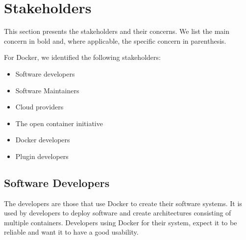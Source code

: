 
\section{Stakeholders}
\label{sec:stakeholders}
This section presents the stakeholders and their concerns. We list the main concern in bold and, where applicable, the specific concern in parenthesis.

For Docker, we identified the following stakeholders:
\begin{itemize}
\item Software developers
\item Software Maintainers
\item Cloud providers
\item The open container initiative
\item Docker developers
\item Plugin developers
\end{itemize}

\subsection*{Software Developers}
The developers are those that use Docker to create their software systems. It is used by developers to deploy software and create architectures consisting of multiple containers. Developers using Docker for their system, expect it to be reliable and want it to have a good usability. 

